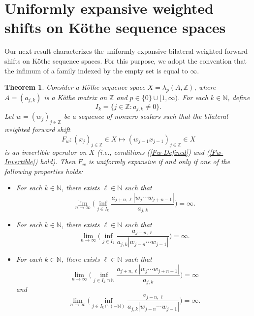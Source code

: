 \documentclass[12pt]{amsart}
\theoremstyle{theorem}
\newtheorem{theorem}{Theorem}%
\theoremstyle{definition}
\theoremstyle{remark} \theoremstyle{question} \theoremstyle{example}
\newcommand{\N}{\mathbb{N}}   %
\newcommand{\Z}{\mathbb{Z}}   %
\begin{document}
\section{Uniformly expansive weighted shifts on K\"othe sequence spaces}\label{S-UE-K}

Our next result characterizes the uniformly expansive bilateral weighted forward shifts on K\"othe sequence spaces.
For this purpose, we adopt the convention that the infimum of a family indexed by the empty set is equal to $\infty$.

\begin{theorem}\label{UEWS-T1}
Consider a K\"othe sequence space $X = \lambda_p(A,\Z)$, where $A = (a_{j,k})$ is a K\"othe matrix on $\Z$ 
and $p \in \{0\} \cup [1,\infty)$. For each $k \in \N$, define
\[
I_k = \{j \in \Z : a_{j,k} \neq 0\}.
\]
Let $w = (w_j)_{j \in \Z}$ be a sequence of nonzero scalars such that the bilateral weighted forward shift
\[
F_w : (x_j)_{j \in \Z} \in X \mapsto (w_{j-1}x_{j-1})_{j \in \Z} \in X
\]
is an invertible operator on $X$ (i.e., conditions (\ref{Fw-Defined}) and (\ref{Fw-Invertible}) hold). 
Then $F_w$ is uniformly expansive if and only if one of the following properties holds:
\begin{itemize}
\item [\rm (A)] For each $k \in \N$, there exists $\ell \in \N$ such that
    \[
    \lim_{n \to \infty} \Big(\inf_{j \in I_k} \frac{a_{j+n,\ell} |w_j \cdots w_{j+n-1}|}{a_{j,k}}\Big) = \infty.
    \]
\item [\rm (B)] For each $k \in \N$, there exists $\ell \in \N$ such that
    \[
    \lim_{n \to \infty} \Big(\inf_{j \in I_k} \frac{a_{j-n,\ell}}{a_{j,k} |w_{j-n} \cdots w_{j-1}|}\Big) = \infty.
    \]
\item [\rm (C)] For each $k \in \N$, there exists $\ell \in \N$ such that
    \[
    \lim_{n \to \infty} \Big(\inf_{j \in I_k \cap \N} \frac{a_{j+n,\ell} |w_j \cdots w_{j+n-1}|}{a_{j,k}}\Big) = \infty
    \]
    and
    \[
    \lim_{n \to \infty} \Big(\inf_{j \in I_k \cap (-\N)} \frac{a_{j-n,\ell}}{a_{j,k} |w_{j-n} \cdots w_{j-1}|}\Big) = \infty.
    \]
\end{itemize}
\end{theorem}
\end{document}
